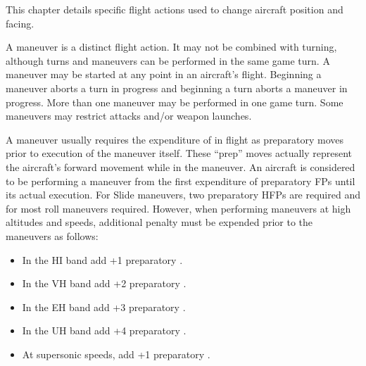 \label{rule:special-maneuvers}

This chapter details specific flight actions used to change aircraft position and facing.

A maneuver is a distinct flight action. It may not be combined with turning, although turns and maneuvers can be performed in the same game turn. A maneuver may be started at any point in an aircraft's flight. Beginning a maneuver aborts a turn in progress and beginning a turn aborts a maneuver in progress. More than one maneuver may be performed in one game turn. Some maneuvers may restrict attacks and/or weapon launches.


A maneuver usually requires the expenditure of  in flight as preparatory moves prior to execution of the maneuver itself.  These “prep” moves actually represent the aircraft's forward movement while in the maneuver. An aircraft is considered to be performing a maneuver from the first expenditure of preparatory FPs until its actual execution. For Slide maneuvers, two preparatory HFPs are required and for most roll maneuvers  required. However, when performing maneuvers at high altitudes and speeds, additional penalty  must be expended prior to the maneuvers as follows:

\begin{itemize}
    \item In the HI band add +1 preparatory .
    \item In the VH band add +2 preparatory .
    \item In the EH band add +3 preparatory .
    \item In the UH band add +4 preparatory .
    \item At supersonic speeds, add +1 preparatory .
\end{itemize}

